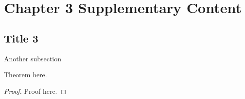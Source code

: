 \chapter{Chapter 3 Supplementary Content}\label{app:ch3suppcontent}
\newpage



\section{Title 3}\label{app:Chap}

Another subsection

\begin{theorem}
Theorem here.
\end{theorem}

\begin{proof}
    Proof here.
\end{proof}